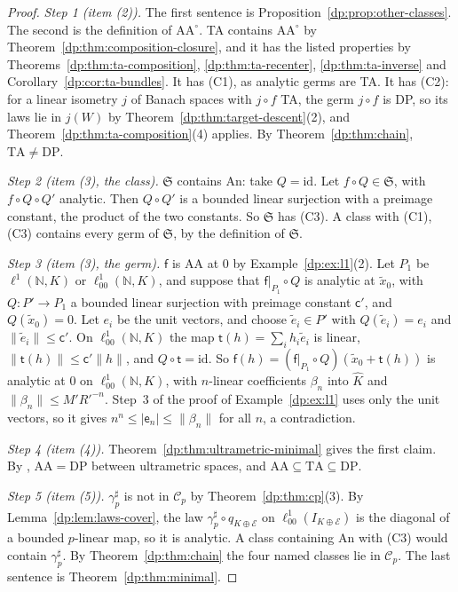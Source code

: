 \documentclass[11pt]{amsart}
\theoremstyle{definition}
\theoremstyle{remark}
\numberwithin{equation}{section}
\newcommand{\N}{\mathbb N}
\newcommand{\id}{\mathrm{id}}
\newcommand{\abs}[1]{\lvert #1\rvert}
\newcommand{\norm}[1]{\lVert #1\rVert}
\newcommand{\cC}{\mathcal{C}}
\newcommand{\Kh}{\widehat K}
\theoremstyle{plain}
\theoremstyle{definition}
\theoremstyle{plain}
\begin{document}
\begin{proof}
\emph{Step 1 (item (2)).} The first sentence is Proposition~\ref{dp:prop:other-classes}. The second is the definition of $\mathrm{AA}^\circ$. TA contains $\mathrm{AA}^\circ$ by Theorem~\ref{dp:thm:composition-closure}, and it has the listed properties by Theorems~\ref{dp:thm:ta-composition}, \ref{dp:thm:ta-recenter}, \ref{dp:thm:ta-inverse} and Corollary~\ref{dp:cor:ta-bundles}. It has (C1), as analytic germs are TA. It has (C2): for a linear isometry $j$ of Banach spaces with $j\circ f$ TA, the germ $j\circ f$ is DP, so its laws lie in $j(W)$ by Theorem~\ref{dp:thm:target-descent}(2), and Theorem~\ref{dp:thm:ta-composition}(4) applies. By Theorem~\ref{dp:thm:chain}, $\mathrm{TA}\ne\mathrm{DP}$.

\emph{Step 2 (item (3), the class).} $\mathfrak S$ contains An: take $Q=\id$. Let $f\circ Q\in\mathfrak S$, with $f\circ Q\circ Q'$ analytic. Then $Q\circ Q'$ is a bounded linear surjection with a preimage constant, the product of the two constants. So $\mathfrak S$ has (C3). A class with (C1), (C3) contains every germ of $\mathfrak S$, by the definition of $\mathfrak S$.

\emph{Step 3 (item (3), the germ).} $\mathsf f$ is AA at $0$ by Example~\ref{dp:ex:l1}(2). Let $P_1$ be $\ell^1(\N,K)$ or $\ell^1_{00}(\N,K)$, and suppose that $\mathsf f|_{P_1}\circ Q$ is analytic at $\tilde x_0$, with $Q\colon P'\to P_1$ a bounded linear surjection with preimage constant $\mathsf c'$, and $Q(\tilde x_0)=0$. Let $e_i$ be the unit vectors, and choose $\tilde e_i\in P'$ with $Q(\tilde e_i)=e_i$ and $\norm{\tilde e_i}\le\mathsf c'$. On $\ell^1_{00}(\N,K)$ the map $\mathsf t(h)=\sum_ih_i\tilde e_i$ is linear, $\norm{\mathsf t(h)}\le\mathsf c'\norm h$, and $Q\circ\mathsf t=\id$. So $\mathsf f(h)=(\mathsf f|_{P_1}\circ Q)(\tilde x_0+\mathsf t(h))$ is analytic at $0$ on $\ell^1_{00}(\N,K)$, with $n$-linear coefficients $\beta_n$ into $\Kh$ and $\norm{\beta_n}\le M'R'^{-n}$. Step~3 of the proof of Example~\ref{dp:ex:l1} uses only the unit vectors, so it gives $n^n\le\abs{\mathsf e_n}\le\norm{\beta_n}$ for all $n$, a contradiction.

\emph{Step 4 (item (4)).} Theorem~\ref{dp:thm:ultrametric-minimal} gives the first claim. By \cite[Theorem~14.39(1)]{I}, $\mathrm{AA}=\mathrm{DP}$ between ultrametric spaces, and $\mathrm{AA}\subseteq\mathrm{TA}\subseteq\mathrm{DP}$.

\emph{Step 5 (item (5)).} $\gamma^\sharp_p$ is not in $\cC_p$ by Theorem~\ref{dp:thm:cp}(3). By Lemma~\ref{dp:lem:laws-cover}, the law $\gamma^\sharp_p\circ q_{K\oplus\mathcal E}$ on $\ell^1_{00}(I_{K\oplus\mathcal E})$ is the diagonal of a bounded $p$-linear map, so it is analytic. A class containing An with (C3) would contain $\gamma^\sharp_p$. By Theorem~\ref{dp:thm:chain} the four named classes lie in $\cC_p$. The last sentence is Theorem~\ref{dp:thm:minimal}.
\end{proof}
\end{document}

